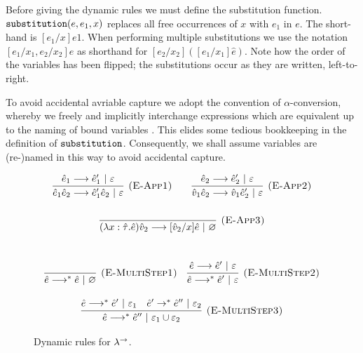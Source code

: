 Before giving the dynamic rules we must define the substitution function. $\mathtt{substitution}(e, e_1, x)$ replaces all free occurrences of $x$ with $e_1$ in $e$. The short-hand is $[e_1/x]e1$. When performing multiple substitutions we use the notation $[e_1/x_1, e_2/x_2] e$ as shorthand for $[e_2/x_2]([e_1/x_1]\hat e)$. Note how the order of the variables has been flipped; the substitutions occur as they are written, left-to-right.

To avoid accidental avriable capture we adopt the convention of $\alpha$-conversion, whereby we freely and implicitly interchange expressions which are equivalent up to the naming of bound variables \cite[p. 71]{tapl}. This elides some tedious bookkeeping in the definition of $\mathtt{substitution}$. Consequently, we shall assume variables are (re-)named in this way to avoid accidental capture.


\begin{figure}[h]

\noindent
{}

\[
\begin{array}{c}

\infer[\textsc{(E-App1)}]
	{\hat e_1 \hat e_2 \longrightarrow \hat e_1' \hat e_2~|~\varepsilon}
	{\hat e_1 \longrightarrow \hat e_1'~|~\varepsilon}
	~~~~~~
\infer[\textsc{(E-App2)}]
	{\hat v_1 \hat e_2 \longrightarrow \hat v_1 \hat e_2'~|~\varepsilon} 
	{\hat e_2 \longrightarrow \hat e_2'~|~\varepsilon}\\[4ex]
	
\infer[\textsc{(E-App3)}]
	{ (\lambda x: \hat \tau.\hat e) \hat v_2 \longrightarrow [\hat v_2/x]\hat e~|~\varnothing }
	{}\\[4ex]
	
\end{array}
\]

\noindent
{}

\[
\begin{array}{c}

\infer[\textsc{(E-MultiStep1)}]
	{\hat e \longrightarrow^{*} \hat e~|~\varnothing}
	{}
~~~
\infer[\textsc{(E-MultiStep2)}]
	{\hat e \longrightarrow^{*} \hat e'~|~\varepsilon}
	{\hat e \longrightarrow \hat e'~|~\varepsilon} \\[3ex]
	
\infer[\textsc{(E-MultiStep3)}]
	{\hat e \longrightarrow^{*} \hat e''~|~\varepsilon_1 \cup \varepsilon_2}
	{\hat e \longrightarrow^{*} \hat e'~|~\varepsilon_1 & \hat e' \rightarrow^{*} \hat e''~|~\varepsilon_2}
\end{array}
\]
\vspace{-7pt}
\caption{Dynamic rules for $\lambda^{\rightarrow}$.}
\label{This is the label.}
\end{figure}

